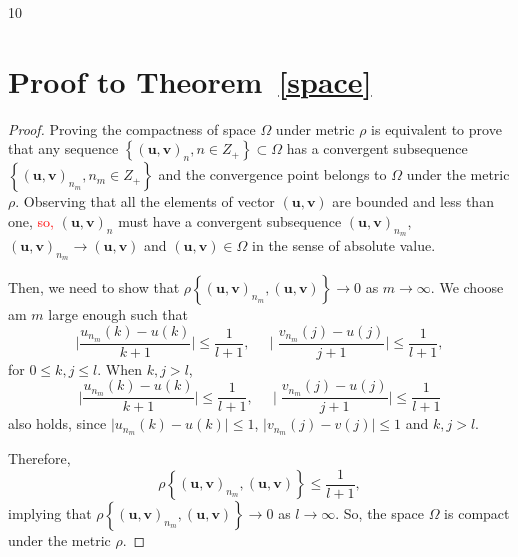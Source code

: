 \documentclass[12pt]{article}
\newtheorem{theorem}{Theorem}[section]
\newcommand{\red}[1]{\textcolor{red}{#1}}
\begin{document}
\begin{thebibliography}{10}
\end{thebibliography}

\appendix


\section{Proof to Theorem~\ref{space}}
\label{appendix A}


\begin{proof}
 Proving the compactness of space $\Omega$ under metric $\rho$ is equivalent to prove that any sequence $\left\{(\textbf{u},\textbf{v})_{n}, n\in Z_+\right\}\subset \Omega$ has a convergent subsequence $\left\{(\textbf{u},\textbf{v})_{n_m},n_m\in Z_+\right\}$ and the convergence point belongs to $\Omega$ under the metric $\rho$. Observing that all the elements of vector $(\textbf{u},\textbf{v})$ are bounded and less than one,  \red{so,} $(\textbf{u},\textbf{v})_{n}$ must have a convergent subsequence $(\textbf{u},\textbf{v})_{n_m}$, $(\textbf{u},\textbf{v})_{n_m}\rightarrow(\textbf{u},\textbf{v})$ and $(\textbf{u},\textbf{v})\in \Omega$ in the sense of absolute value.

Then, we need to show that $\displaystyle \rho\left\{(\textbf{u},\textbf{v})_{n_m}, (\textbf{u},\textbf{v})\right\}\longrightarrow0$ as $m\longrightarrow\infty$.
We choose am $m$ large enough such that
\[\displaystyle\mid\frac{u_{n_m}(k)-u(k)}{k+1}\mid\leq\frac{1}{l+1},~~~~~ \displaystyle\mid\frac{v_{n_m}(j)-u(j)}{j+1}\mid\leq\frac{1}{l+1},\]
 for $0\leq k,j\leq l$. When $k,j>l$,
 \[\displaystyle\mid\frac{u_{n_m}(k)-u(k)}{k+1}\mid\leq\frac{1}{l+1},~~~~~ \displaystyle\mid\frac{v_{n_m}(j)-u(j)}{j+1}\mid\leq\frac{1}{l+1}\]
  also holds, since $\mid u_{n_m}(k)-u(k)\mid\leq 1$, $\mid v_{n_m}(j)-v(j)\mid\leq 1$ and $k,j>l$.

 Therefore,
\[\displaystyle \rho\left\{(\textbf{u},\textbf{v})_{n_m}, (\textbf{u},\textbf{v})\right\}\leq\frac{1}{l+1},\]
implying that $\displaystyle \rho\left\{(\textbf{u},\textbf{v})_{n_m}, (\textbf{u},\textbf{v})\right\} \longrightarrow 0$ as $l\longrightarrow\infty$. So, the space $\Omega$ is compact under the metric $\rho$.
\end{proof}
\end{document}
